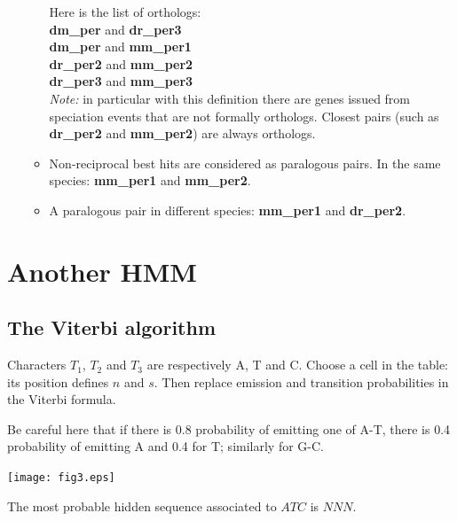 \documentclass[a4paper,11pt]{article}
\begin{document}
\begin{enumerate}
\begin{itemize}
Here is the list of orthologs:\\
{\bf dm\_per} and {\bf dr\_per3} \\
{\bf dm\_per} and {\bf mm\_per1} \\
{\bf dr\_per2} and {\bf mm\_per2} \\
{\bf dr\_per3} and {\bf mm\_per3} \\

\emph{Note:} in particular with this definition there are genes issued from speciation events that are not formally orthologs.
Closest pairs (such as {\bf dr\_per2} and {\bf mm\_per2}) are always orthologs.

	\item Non-reciprocal best hits are considered as paralogous pairs. In the same species: {\bf mm\_per1} and {\bf mm\_per2}.

	\item A paralogous pair in different species: {\bf mm\_per1} and {\bf dr\_per2}.
\end{itemize}
\end{enumerate}

\section{Another HMM}

\subsection{The Viterbi algorithm} 

Characters $T_1$, $T_2$ and $T_3$ are respectively A, T and C.
Choose a cell in the table: its position defines $n$ and $s$. Then replace emission and transition probabilities in the Viterbi formula.

Be careful here that if there is 0.8 probability of emitting one of A-T, there is 0.4 probability of emitting A and 0.4 for T; similarly for G-C.

\begin{center}
\texttt{[image: fig3.eps]}\\
\vspace{0.5cm}
\end{center}
The most probable hidden sequence associated to $ATC$ is $NNN$.


\end{document}

